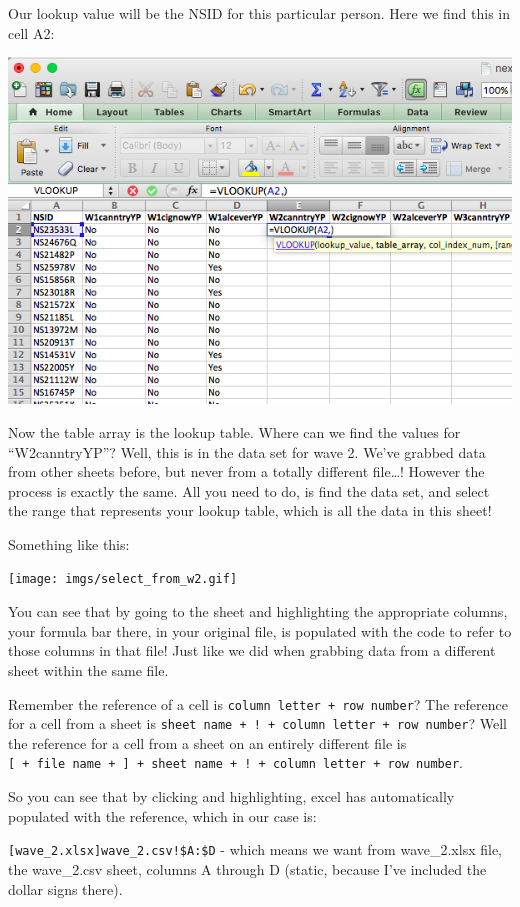 \documentclass[
]{book}
\begin{document}
Our lookup value will be the NSID for this particular person. Here we find this in cell A2:

\includegraphics{imgs/lookup_val_nsid.png}

Now the table array is the lookup table. Where can we find the values for ``W2canntryYP''? Well, this is in the data set for wave 2. We've grabbed data from other sheets before, but never from a totally different file\ldots! However the process is exactly the same. All you need to do, is find the data set, and select the range that represents your lookup table, which is all the data in this sheet!

Something like this:

\texttt{[image: imgs/select\_from\_w2.gif]}

You can see that by going to the sheet and highlighting the appropriate columns, your formula bar there, in your original file, is populated with the code to refer to those columns in that file! Just like we did when grabbing data from a different sheet within the same file.

Remember the reference of a cell is \texttt{column\ letter\ +\ row\ number}? The reference for a cell from a sheet is \texttt{sheet\ name\ +\ !\ +\ column\ letter\ +\ row\ number}? Well the reference for a cell from a sheet on an entirely different file is \texttt{{[}\ +\ file\ name\ +\ {]}\ +\ sheet\ name\ +\ !\ +\ column\ letter\ +\ row\ number}.

So you can see that by clicking and highlighting, excel has automatically populated with the reference, which in our case is:

\texttt{{[}wave\_2.xlsx{]}wave\_2.csv!\$A:\$D} - which means we want from wave\_2.xlsx file, the wave\_2.csv sheet, columns A through D (static, because I've included the dollar signs there).
\end{document}

